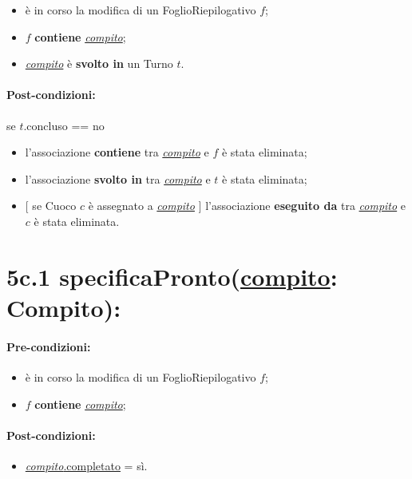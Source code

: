 \begin{itemize}
    \item è in corso la modifica di un FoglioRiepilogativo $f$;
    \item $f$ \textbf{contiene} \underline{\textit{compito}};
    \item \underline{\textit{compito}} è \textbf{svolto in} un Turno $t$.
\end{itemize}

\paragraph{Post-condizioni:} se $t$.concluso == no

\begin{itemize}
    \item l'associazione \textbf{contiene} tra \underline{\textit{compito}} e $f$ è stata eliminata;
    \item l'associazione \textbf{svolto in} tra \underline{\textit{compito}} e $t$ è stata eliminata;
    \item $[$ se Cuoco $c$ è assegnato a \underline{\textit{compito}} $]$ l'associazione \textbf{eseguito da} tra \underline{\textit{compito}} e $c$ è stata eliminata.
\end{itemize}

\section*{5c.1 specificaPronto(\underline{compito}: Compito):}

\paragraph{Pre-condizioni:}

\begin{itemize}
    \item è in corso la modifica di un FoglioRiepilogativo $f$;
    \item $f$ \textbf{contiene} \underline{\textit{compito}};
\end{itemize}

\paragraph{Post-condizioni:}

\begin{itemize}
    \item \underline{\textit{compito}.completato} = sì.
\end{itemize}

